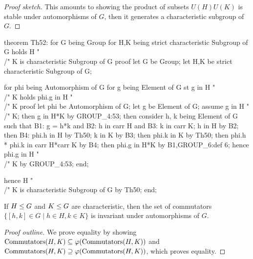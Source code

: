 \begin{proof}[Proof sketch]
This amounts to showing the product of subsets $U(H)U(K)$ is stable
under automorphisms of $G$, then it generates a characteristic subgroup
of $G$.
\end{proof}

\nwenddocs{}\endmoddef\nwstartdeflinemarkup{}\nwenddeflinemarkup
theorem Th52:
  for G being Group
  for H,K being strict characteristic Subgroup of G
  holds H "\\/" K is characteristic Subgroup of G
proof
  let G be Group;
  let H,K be strict characteristic Subgroup of G;

  for phi being Automorphism of G
  for g being Element of G st g in H "\\/" K
  holds phi.g in H "\\/" K
  proof
    let phi be Automorphism of G;
    let g be Element of G;
    assume g in H "\\/" K;
    then g in H*K by GROUP_4:53;
    then consider h, k being Element of G such that
    B1: g = h*k and
    B2: h in carr H and
    B3: k in carr K;
    h in H by B2;
    then B4: phi.h in H by Th50;
    k in K by B3;
    then phi.k in K by Th50;
    then phi.h * phi.k in carr H*carr K by B4;
    then phi.g in H*K by B1,GROUP_6:def 6;
    hence phi.g in H "\\/" K by GROUP_4:53;
  end;

  hence H "\\/" K is characteristic Subgroup of G by Th50;
end;
\eatline
{}\nwendcode{}\nwdocspar
\begin{theorem}
If $H\subgroup G$ and $K\subgroup G$ are characteristic, then the set of
commutators $\{[h,k]\in G\mid h\in H, k\in K\}$ is invariant under
automorphisms of $G$.
\end{theorem}

\begin{proof}[Proof outline]
We prove equality by showing ${\rm Commutators}(H,K)\subset\varphi({\rm Commutators}(H,K))$
and ${\rm Commutators}(H,K)\supset\varphi({\rm Commutators}(H,K))$,
which proves equality.
\end{proof}


